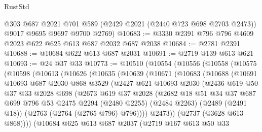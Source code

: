 \begin{lexlean}{RustStd}
\begin{coremodule}
      @303
      @687
      @2021
      @701
      @589
      (@2429 @2021 (@2440 @723 @698 @2703 @2473))
      @9017
      @9695
      @9697
      @9700
      @2769)
@10683 := @3330 @2391 @796 @796 @4609 @2023 @622 @625 @613 @687 @2032 @687 @2038
@10684 := @2781 @2391
@10688 := @10684 @622 @613 @687 @2031
@10691 := @2719 @139 @613 @621
@10693 := @24 @37 @33
@10773 := @10510
    (@10554
      (@10556
        (@10558
          (@10575
            (@10598
              (@10613
                (@10626
                  (@10635
                    (@10639
                      (@10671
                        (@10683
                          (@10688
                            (@10691
                              @10693
                              @687
                              @2030
                              @868
                              @3529
                              (@2427
                                @621
                                @10693
                                @2030
                                (@2436
                                  @619
                                  @50
                                  @37
                                  @33
                                  @2028
                                  @698
                                  (@2673
                                    @619
                                    @37
                                    @2028
                                    (@2682
                                      @18
                                      @51
                                      @34
                                      @37
                                      @687
                                      @699
                                      @796
                                      @53
                                      @2475
                                      @2294
                                      (@2480 @2255)
                                      (@2484 @2263)
                                      (@2489 (@2491 @18))
                                      (@2763 (@2764 (@2765 @796) @796))))
                                  @2473))
                              (@2737 (@3628 @613 @868))))
                          (@10684
                            @625
                            @613
                            @687
                            @2037
                            (@2719
                              @167
                              @613
                              @50
                              @33

\end{coremodule}
\end{lexlean}
